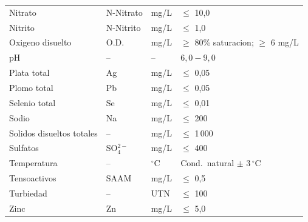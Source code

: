 \documentclass[12pt,a4paper]{article}
\begin{document}
\begin{longtable}{p{4.5cm}p{2.0cm}p{2.0cm}p{3.5cm}}
Nitrato & N-Nitrato & mg/L & $\leq$ 10,0 \\
Nitrito & N-Nitrito & mg/L & $\leq$ 1,0 \\
Oxigeno disuelto & O.D. & mg/L & $\geq$ 80\% saturacion; $\geq$ 6 mg/L \\
pH & -- & -- & $6,0 - 9,0$ \\
Plata total & Ag & mg/L & $\leq$ 0,05 \\
Plomo total & Pb & mg/L & $\leq$ 0,05 \\
Selenio total & Se & mg/L & $\leq$ 0,01 \\
Sodio & Na & mg/L & $\leq$ 200 \\
Solidos disueltos totales & -- & mg/L & $\leq$ 1\,000 \\
Sulfatos & SO$_4^{2-}$ & mg/L & $\leq$ 400 \\
Temperatura & -- & $^\circ$C & Cond.\ natural $\pm$ 3\,$^\circ$C \\
Tensoactivos & SAAM & mg/L & $\leq$ 0,5 \\
Turbiedad & -- & UTN & $\leq$ 100 \\
Zinc & Zn & mg/L & $\leq$ 5,0 \\
\end{longtable}
\end{document}
